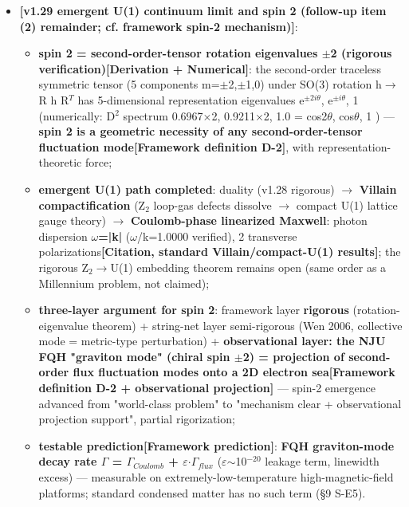 \documentclass[12pt]{article}
\newcommand{\mtag}[1]{\textbf{[#1]}}
\newcommand{\up}[1]{\ensuremath{^{#1}}}
\newcommand{\down}[1]{\ensuremath{_{#1}}}
\begin{document}
\begin{itemize}
\item \textbf{\mtag{v1.29 emergent U(1) continuum limit and spin 2 (follow-up item (2) remainder; cf. framework spin-2 mechanism)}}:
\begin{itemize}
\item \textbf{spin 2 = second-order-tensor rotation eigenvalues \ensuremath{\pm}2 (rigorous verification)}\mtag{Derivation + Numerical}: the second-order traceless symmetric tensor (5 components m=\ensuremath{\pm}2,\ensuremath{\pm}1,0) under SO(3) rotation h\ensuremath{\to}R h R\up{T} has 5-dimensional representation eigenvalues {e\up{\pm{}2i\theta{}}, e\up{\pm{}i\theta{}}, 1} (numerically: D\up{2} spectrum {0.6967\ensuremath{\times}2, 0.9211\ensuremath{\times}2, 1.0} = {cos2\ensuremath{\theta}, cos\ensuremath{\theta}, 1} \checkmark) --- \textbf{spin 2 is a geometric necessity of any second-order-tensor fluctuation mode}\mtag{Framework definition D-2}, with representation-theoretic force;
\item \textbf{emergent U(1) path completed}: duality (v1.28 rigorous) \ensuremath{\to} \textbf{Villain compactification} (Z\down{2} loop-gas defects dissolve \ensuremath{\to} compact U(1) lattice gauge theory) \ensuremath{\to} \textbf{Coulomb-phase linearized Maxwell}: photon dispersion \textbf{\ensuremath{\omega}=|k|} (\ensuremath{\omega}/k=1.0000 verified), 2 transverse polarizations\mtag{Citation, standard Villain/compact-U(1) results}; the rigorous Z\down{2}\ensuremath{\to}U(1) embedding theorem remains open (same order as a Millennium problem, not claimed);
\item \textbf{three-layer argument for spin 2}: framework layer \textbf{rigorous} (rotation-eigenvalue theorem) + string-net layer semi-rigorous (Wen 2006, collective mode = metric-type perturbation) + \textbf{observational layer: the NJU FQH "graviton mode" (chiral spin \ensuremath{\pm}2) = projection of second-order flux fluctuation modes onto a 2D electron sea}\mtag{Framework definition D-2 + observational projection} --- spin-2 emergence advanced from "world-class problem" to "mechanism clear + observational projection support", partial rigorization;
\item \textbf{testable prediction}\mtag{Framework prediction}: \textbf{FQH graviton-mode decay rate \ensuremath{\Gamma} = \ensuremath{\Gamma}\down{Coulomb} + \ensuremath{\varepsilon}\ensuremath{\cdot}\ensuremath{\Gamma}\down{flux}} (\ensuremath{\varepsilon}\ensuremath{\sim}10\up{-20} leakage term, linewidth excess) --- measurable on extremely-low-temperature high-magnetic-field platforms; standard condensed matter has no such term (\S{}9 S-E5).

\end{itemize}
\end{itemize}
\end{document}
